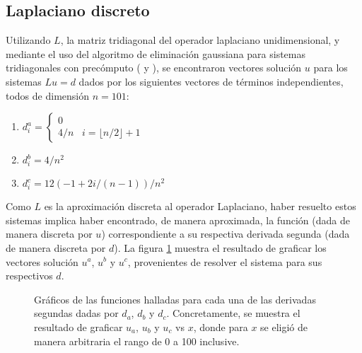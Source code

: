 \subsection{Laplaciano discreto}
\label{aplicaciones_laplaciano}

Utilizando $L$, la matriz tridiagonal del operador laplaciano unidimensional, y mediante el uso del algoritmo de eliminación gaussiana para sistemas tridiagonales con precómputo ( y ), se encontraron vectores solución $u$ para los sistemas $Lu=d$ dados por los siguientes vectores de términos independientes, todos de dimensión $n=101$:
\begin{enumerate}[label=(\alph*)]
    \item $d^a_i = \begin{cases}0\\4/n\phantom{...}i=\lfloor n/2 \rfloor+1\end{cases}$
    \item $d^b_i = 4/n^2$
    \item $d^c_i = 12(-1+2i/(n-1))/n^2$
\end{enumerate}
Como $L$ es la aproximación discreta al operador Laplaciano, haber resuelto estos sistemas implica haber encontrado, de manera aproximada, la función (dada de manera discreta por $u$) correspondiente a su respectiva derivada segunda (dada de manera discreta por $d$). La figura \ref{fig:laplaciano_discreto} muestra el resultado de graficar los vectores solución $u^a$, $u^b$ y $u^c$, provenientes de resolver el sistema para sus respectivos $d$.

\begin{figure}[h!]
    \centering
    \caption{Gráficos de las funciones halladas para cada una de las derivadas segundas dadas por $d_a$, $d_b$ y $d_c$. Concretamente, se muestra el resultado de graficar $u_a$, $u_b$ y $u_c$ vs $x$, donde para $x$ se eligió de manera arbitraria el rango de 0 a 100 inclusive.}
    \label{fig:laplaciano_discreto}
\end{figure}
